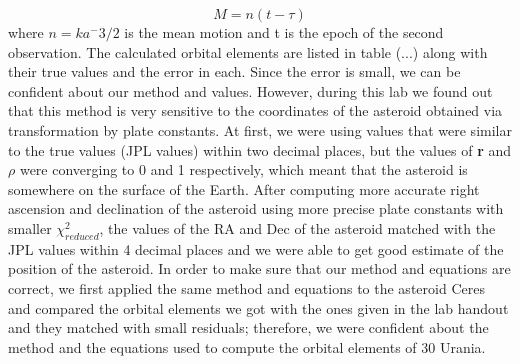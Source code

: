 \documentclass[letterpaper,12pt]{article}
\begin{document}
\begin{equation}
M = n(t-\tau)
\end{equation}
where \begin{math} n=ka^-3/2 \end{math} is the mean motion and t is the epoch of the second observation. The calculated orbital elements are listed in table (...) along with their true values and the error in each. Since the error is small, we can be confident about our method and values. However, during this lab we found out that this method is very sensitive to the coordinates of the asteroid obtained via transformation by plate constants. At first, we were using values that were similar to the true values (JPL values) within two decimal places, but the values of {\bf r} and \begin{math} \rho \end{math} were converging to 0 and 1 respectively, which meant that the asteroid is somewhere on the surface of the Earth. After computing more accurate right ascension and declination of the asteroid using more precise plate constants with smaller \begin{math} \chi_{reduced}^2 \end{math}, the values of the RA and Dec of the asteroid matched with the JPL values within 4 decimal places and we were able to get good estimate of the position of the asteroid.
In order to make sure that our method and equations are correct, we first applied the same method and equations to the asteroid Ceres and compared the orbital elements we got with the ones given in the lab handout and they matched with small residuals; therefore, we were confident about the method and the equations used to compute the orbital elements of 30 Urania.
\end{document}
